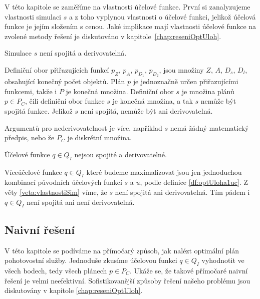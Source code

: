 V této kapitole se zaměříme na vlastnosti účelové funkce.
První si zanalyzujeme vlastnosti simulaci $s$ a z toho vyplynou vlastnosti o účelové funkci, jelikož účelová funkce je jejím složením s cenou.
Jaké implikace mají vlastnosti účelové funkce na zvolené metody řešení je diskutováno v kapitole~\ref{chap:reseniOptUloh}.

\begin{veta}\label{veta:vlastnostiSim}
  Simulace $s$ není spojitá a derivovatelná.
\end{veta}

\begin{dukaz}
  Definiční obor přiřazujících funkcí $p_Z$, $p_A$, $p_{D_{1}}$, $p_{D_{2}}$, jsou množiny $Z$, $A$, $D_s$, $D_l$, obsahující konečný počet objektů.
  Plán $p$ je jednoznačně určen přiřazujícími funkcemi, takže i $P$ je konečná množina.
  Definiční obor $s$ je množina plánů $p \in P_C$, čili definiční obor funkce $s$ je konečná množina, a tak $s$ nemůže být spojitá funkce.
  Jelikož $s$ není spojitá, nemůže být ani derivovatelná.

  Argumentů pro nederivovatelnost je více, například $s$ nemá žádný matematický předpis, nebo že $P_C$ je diskrétní množina.
\end{dukaz}

\begin{veta}\label{veta:nespANedevQ}
  Účelové funkce $q \in Q_I$ nejsou spojité a derivovatelné.
\end{veta}

\begin{dukaz}
  Víceúčelové funkce $q \in Q_I$ které budeme maximalizovat jsou jen jednoduchou kombinací původních účelových funkcí $s$ a $u$, podle definice \ref{df:optUloha1uc}.
  Z věty \ref{veta:vlastnostiSim} víme, že $s$ není spojitá ani derivovatelná.
  Tím pádem i $q \in Q_I$ není spojitá ani není derivovatelná.
\end{dukaz}

\subsection{Naivní řešení}\label{kap:naivniRes}

V této kapitole se podíváme na přímočarý způsob, jak nalézt optimální plán pohotovostní služby. 
Jednoduše zkusíme účelovou funkci $q \in Q_I$ vyhodnotit ve všech bodech, tedy všech plánech $p \in P_C$.
Ukáže se, že takové přímočaré naivní řešení je velmi neefektivní. Sofistikovanější způsoby řešení našeho problému jsou diskutovány v kapitole \ref{chap:reseniOptUloh}.

